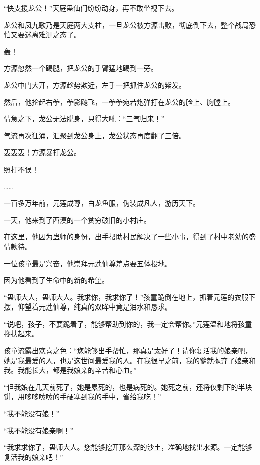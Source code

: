
\begin{this_body}



“快支援龙公！”天庭蛊仙们纷纷动身，再不敢坐视下去。

龙公和凤九歌乃是天庭两大支柱，一旦龙公被方源击败，彻底倒下去，整个战局恐怕又要迷离难测之态了。

轰！

方源忽然一个踢腿，把龙公的手臂猛地踢到一旁。

龙公中门大开，方源趁势欺近，左手一把抓住龙公的紫发。

然后，他抡起右拳，拳影飚飞，一拳拳宛若炮弹打在龙公的脸上、胸膛上。

情急之下，龙公无法脱身，只得大吼：“三气归来！”

气流再次狂涌，汇聚到龙公身上，龙公状态再度翻了三倍。

轰轰轰！方源暴打龙公。

照打不误！

……

一百多万年前，元莲成尊，白龙鱼服，伪装成凡人，游历天下。

一天，他来到了西漠的一个贫穷破旧的小村庄。

在这里，他因为蛊师的身份，出手帮助村民解决了一些小事，得到了村中老幼的盛情款待。

一位孩童最是兴奋，他崇拜元莲仙尊差点要五体投地。

因为他看到了生命中的新的希望。

“蛊师大人，蛊师大人。我求你，我求你了！”孩童跪倒在地上，抓着元莲的衣服下摆，仰望着元莲仙尊，纯真的双眸中竟是泪水和恳求。

“说吧，孩子，不要跪着了，能够帮助到你的，我一定会帮你。”元莲温和地将孩童搀扶起来。

孩童流露出欢喜之色：“您能够出手帮忙，那真是太好了！请你复活我的娘亲吧，她是我最爱的人，也是这世间最爱我的人。在我很早之前，我的爹就抛弃了娘亲和我。我能长大，都是我娘亲的辛苦和心血。”

“但我娘在几天前死了，她是累死的，也是病死的。她死之前，还将仅剩下的半块饼，用哆哆嗦嗦的手硬塞到我的手中，省给我吃！”

“我不能没有娘！”

“我不能没有娘亲啊！”

“我求求你了，蛊师大人。您能够挖开那么深的沙土，准确地找出水源。一定能够复活我的娘亲吧！”


\end{this_body}
